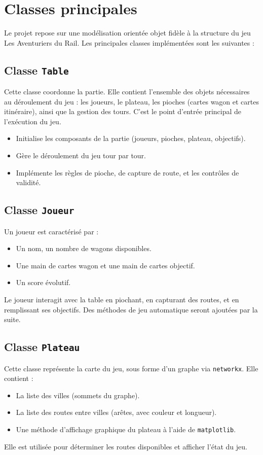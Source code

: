 \documentclass[a4paper,12pt]{report}
\begin{document}
\section{Classes principales}

Le projet repose sur une modélisation orientée objet fidèle à la structure du jeu Les Aventuriers du Rail.
Les principales classes implémentées sont les suivantes :

\subsection*{Classe \texttt{Table}}

Cette classe coordonne la partie. Elle contient l’ensemble des objets nécessaires au déroulement du jeu :
les joueurs, le plateau, les pioches (cartes wagon et cartes itinéraire), ainsi que la gestion des tours.
C’est le point d’entrée principal de l’exécution du jeu.

\begin{itemize}
    \item Initialise les composants de la partie (joueurs, pioches, plateau, objectifs).
    \item Gère le déroulement du jeu tour par tour.
    \item Implémente les règles de pioche, de capture de route, et les contrôles de validité.
\end{itemize}

\subsection*{Classe \texttt{Joueur}}

Un joueur est caractérisé par :
\begin{itemize}
    \item Un nom, un nombre de wagons disponibles.
    \item Une main de cartes wagon et une main de cartes objectif.
    \item Un score évolutif.
\end{itemize}
Le joueur interagit avec la table en piochant, en capturant des routes, et en remplissant ses objectifs.
Des méthodes de jeu automatique seront ajoutées par la suite.

\subsection*{Classe \texttt{Plateau}}

Cette classe représente la carte du jeu, sous forme d’un graphe via \texttt{networkx}. Elle contient :
\begin{itemize}
    \item La liste des villes (sommets du graphe).
    \item La liste des routes entre villes (arêtes, avec couleur et longueur).
    \item Une méthode d'affichage graphique du plateau à l’aide de \texttt{matplotlib}.
\end{itemize}
Elle est utilisée pour déterminer les routes disponibles et afficher l’état du jeu.
\end{document}

